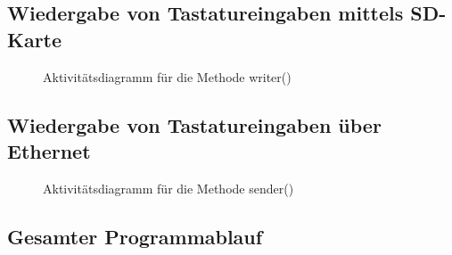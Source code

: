 \subsection{Wiedergabe von Tastatureingaben mittels SD-Karte}
\begin{figure}
  \centering
  \caption{Aktivitätsdiagramm für die Methode writer()}
  \label{diagram_writer}
\end{figure}

\subsection{Wiedergabe von Tastatureingaben über Ethernet}
\begin{figure}
  \centering
  \caption{Aktivitätsdiagramm für die Methode sender()}
  \label{diagram_sender}
\end{figure}

\subsection{Gesamter Programmablauf}



